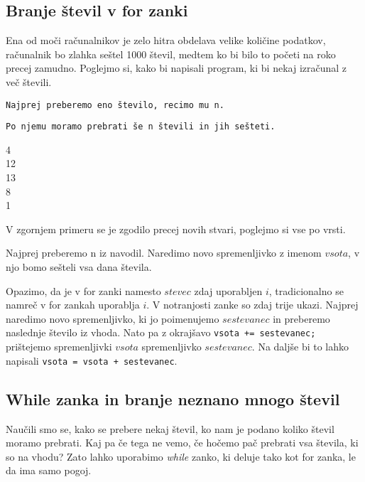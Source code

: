 \subsection{Branje števil v for zanki}

Ena od moči računalnikov je zelo hitra obdelava velike količine podatkov,
računalnik bo zlahka seštel 1000 števil, medtem ko bi bilo to početi na roko
precej zamudno. Poglejmo si, kako bi napisali program, ki bi nekaj izračunal z
več števili.

\begin{examples}
\verb+Najprej preberemo eno število, recimo mu n.+
	
\verb+Po njemu moramo prebrati še n števili in jih sešteti.+
	
	
\begin{inout}
	4  \\
	12 \\
	13 \\
	8  \\
	1
\end{inout}
	
\end{examples}

V zgornjem primeru se je zgodilo precej novih stvari, poglejmo si vse po vrsti.

Najprej preberemo n iz navodil. Naredimo novo spremenljivko z imenom $vsota$, v njo
bomo sešteli vsa dana števila.

Opazimo, da je v for zanki namesto $stevec$ zdaj uporabljen $i$, tradicionalno
se namreč v for zankah uporablja $i$. 
V notranjosti zanke so zdaj trije ukazi. Najprej naredimo novo
spremenljivko, ki jo poimenujemo $sestevanec$ in preberemo naslednje
število iz vhoda. Nato pa z okrajšavo \texttt{vsota~+=~sestevanec;} prištejemo
spremenljivki $vsota$ spremenljivko $sestevanec$. Na daljše bi to lahko napisali
\texttt{vsota~=~vsota~+~sestevanec}.

\subsection{While zanka in branje neznano mnogo števil}

Naučili smo se, kako se prebere nekaj števil, ko nam je podano koliko števil
moramo prebrati. Kaj pa če tega ne vemo, če hočemo pač prebrati vsa števila,
ki so na vhodu? Zato lahko uporabimo \emph{while} zanko, ki deluje tako kot
for zanka, le da ima samo pogoj.

